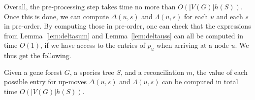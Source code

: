 \documentclass[10pt]{article}
\begin{document}
Overall, the pre-processing step takes time no more than $O(|V(G)|h(S))$.
Once this is done, we can compute $\Delta(u, s)$ and $\Lambda(u, s)$ for each $u$ and each $s$ in pre-order.  
By computing those in pre-order, one can check that the expressions from Lemma~\ref{lem:deltasum} and Lemma~\ref{lem:deltauss} can all be computed in time $O(1)$, if we have access to the entries of $p_u$ when arriving at a node $u$.  We thus get the following.
    
    

    


\begin{theorem}
Given a gene forest $G$, a species tree $S$, and a reconciliation $m$, the value of each possible entry for up-moves $\Delta(u, s)$ and $\Lambda(u, s)$ can be computed in total time $O(|V(G)|h(S))$.
\end{theorem}
\end{document}

